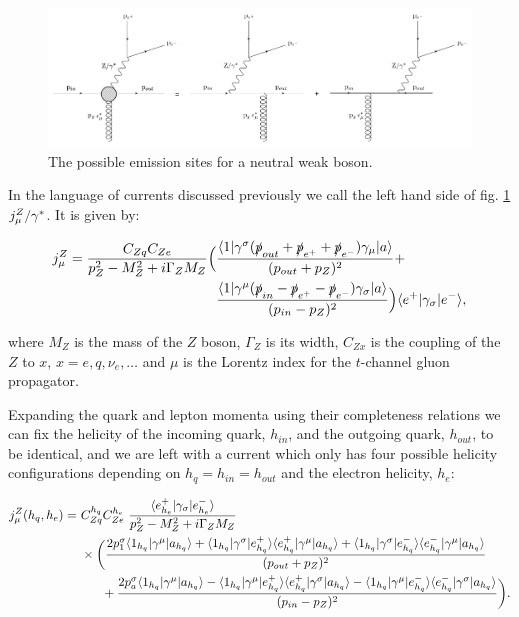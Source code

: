 		\begin{figure}[hbt]
			\includegraphics[width=0.98\linewidth]{figures/EmissionSites.pdf}
			\caption{The possible emission sites for a neutral weak boson.}
			\label{fig:emissionsites}
		\end{figure}

		In the language of currents discussed previously we call the left hand side of
		fig. \ref{fig:emissionsites} $j_\mu^Z/\gamma^*$.  It is given by:

		\begin{align}
		  \begin{split}
		    j^Z_\mu = \frac{C_{Zq}C_{Ze}}{p_Z^2 - M^2_Z +
		      i\Gamma_ZM_Z}\Big(&\frac{\langle 1 | \gamma^{\sigma}(\slashed p_{out} + \slashed
		        p_{e^+} + \slashed p_{e^-})\gamma_{\mu} | a \rangle}{(p_{out} + p_Z)^2} + \\
		    &\frac{\langle 1 | \gamma^{\mu}(\slashed p_{in} - \slashed p_{e^+} - \slashed
		        p_{e^-})\gamma_{\sigma} | a \rangle}{(p_{in} - p_Z)^2}\Big)\langle e^+ | \gamma_{\sigma} | e^- \rangle,
		    \label{eqn:Zcurrent}
		  \end{split}
		\end{align}

		where $M_Z$ is the mass of the $Z$ boson, $\Gamma_Z$ is its width, $C_{Zx}$ is
		the coupling of the $Z$ to $x$, $x=e,q,\nu_e,\ldots$ and $\mu$ is the Lorentz
		index for the $t$-channel gluon propagator.

		Expanding the quark and lepton momenta using their completeness relations we can
		fix the helicity of the incoming quark, $h_{in}$, and the outgoing quark,
		$h_{out}$, to be identical, and we are left with a current which only has four
		possible helicity configurations depending on $h_q = h_{in} = h_{out}$ and the
		electron helicity, $h_e$:

		\begin{align}
		  \begin{split}
		    j^Z_\mu(h_q, h_e) = &\ C_{Zq}^{h_q}C_{Ze}^{h_e}\ \frac{\bk{e^+_{h_e}}{\gl{\sigma}}{e^-_{h_e}}}{p_Z^2 -
		      M^2_Z + i\Gamma_ZM_Z} \\ &\ \times\bigg(\frac{2p_1^\sigma\bk{1_{h_q}}{\gu{\mu}}{a_{h_q}} +
		      \bk{1_{h_q}}{\gu{\sigma}}{e^+_{h_q}} \bk{e^+_{h_q}}{\gu{\mu}}{a_{h_q}} +
		      \bk{1_{h_q}}{\gu{\sigma}}{e^-_{h_q}} \bk{e^-_{h_q}}{\gu{\mu}}{a_{h_q}}}
		    {(p_{out} + p_Z)^2}\\
		    &\qquad + \frac{ 2p_a^\sigma\bk{1_{h_q}}{\gu{\mu}}{a_{h_q}} -
		      \bk{1_{h_q}}{\gu{\mu}}{e^+_{h_q}} \bk{e^+_{h_q}}{\gu{\sigma}}{a_{h_q}} -
		      \bk{1_{h_q}}{\gu{\mu}}{e^-_{h_q}} \bk{e^-_{h_q}}{\gu{\sigma}}{a_{h_q}}}
		    {(p_{in} - p_Z)^2}\bigg).
		    \label{eq:Zcurrent}
		  \end{split}
		\end{align}

